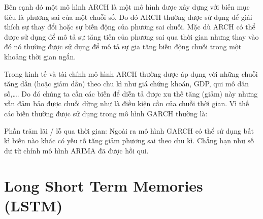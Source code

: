 Bên cạnh đó một mô hình ARCH là một mô hình được xây dựng với biến mục tiêu là phương sai của một chuỗi số. Do đó ARCH thường được sử dụng để giải thích sự thay đổi hoặc sự biến động của phương sai chuỗi. Mặc dù ARCH có thể được sử dụng để mô tả sự tăng tiến của phương sai qua thời gian nhưng thay vào đó nó thường được sử dụng để mô tả sự gia tăng biến động chuỗi trong một khoảng thời gian ngắn.

Trong kinh tế và tài chính mô hình ARCH thường được áp dụng với những chuỗi tăng dần (hoặc giảm dần) theo chu kì như giá chứng khoán, GDP, qui mô dân số,…. Do đó chúng ta cần các biến để diễn tả được xu thế tăng (giảm) này nhưng vẫn đảm bảo được chuỗi dừng như là điều kiện cần của chuỗi thời gian. Vì thế các biến thường được sử dụng trong mô hình GARCH thường là:

Phần trăm lãi / lỗ qua thời gian:
Ngoài ra mô hình GARCH có thể sử dụng bất kì biến nào khác có yếu tố tăng giảm phương sai theo chu kì. Chẳng hạn như số dư từ chính mô hình ARIMA đã được hồi qui.



\section{Long Short Term Memories (LSTM)}








